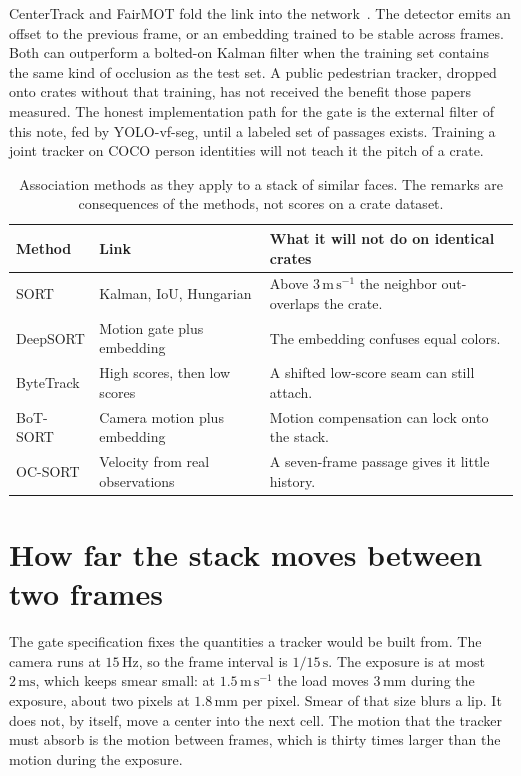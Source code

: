 \documentclass[11pt,a4paper]{article}
\begin{document}
CenterTrack and FairMOT fold the link into the network~\cite{zhou2020centertrack,zhang2021fairmot}. The detector emits an offset to the previous frame, or an embedding trained to be stable across frames. Both can outperform a bolted-on Kalman filter when the training set contains the same kind of occlusion as the test set. A public pedestrian tracker, dropped onto crates without that training, has not received the benefit those papers measured. The honest implementation path for the gate is the external filter of this note, fed by YOLO-vf-seg, until a labeled set of passages exists. Training a joint tracker on COCO person identities will not teach it the pitch of a crate.

\begin{table}[t]
\centering
\small
\begin{tabular}{llp{6.6cm}}
\toprule
Method & Link & What it will not do on identical crates \\
\midrule
SORT & Kalman, IoU, Hungarian & Above $3\,\mathrm{m\,s^{-1}}$ the neighbor out-overlaps the crate. \\
DeepSORT & Motion gate plus embedding & The embedding confuses equal colors. \\
ByteTrack & High scores, then low scores & A shifted low-score seam can still attach. \\
BoT-SORT & Camera motion plus embedding & Motion compensation can lock onto the stack. \\
OC-SORT & Velocity from real observations & A seven-frame passage gives it little history. \\
\bottomrule
\end{tabular}
\caption{Association methods as they apply to a stack of similar faces. The remarks are consequences of the methods, not scores on a crate dataset.}
\label{tab:trackers}
\end{table}

\section{How far the stack moves between two frames}
\label{sec:passage}

The gate specification fixes the quantities a tracker would be built from. The camera runs at $15\,\mathrm{Hz}$, so the frame interval is $1/15\,\mathrm{s}$. The exposure is at most $2\,\mathrm{ms}$, which keeps smear small: at $1.5\,\mathrm{m\,s^{-1}}$ the load moves $3\,\mathrm{mm}$ during the exposure, about two pixels at $1.8\,\mathrm{mm}$ per pixel. Smear of that size blurs a lip. It does not, by itself, move a center into the next cell. The motion that the tracker must absorb is the motion between frames, which is thirty times larger than the motion during the exposure.
\end{document}
